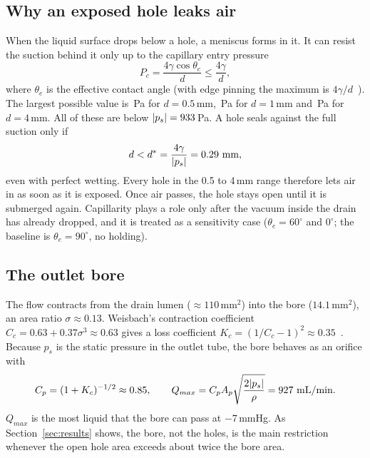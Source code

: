 \documentclass[10pt,a4paper]{article}
\begin{document}
\subsection{Why an exposed hole leaks air}
When the liquid surface drops below a hole, a meniscus forms in it. It can resist the suction behind it only up to the capillary entry pressure
\begin{equation}
P_c=\frac{4\gamma\cos\theta_e}{d}\le\frac{4\gamma}{d},
\label{eq:pc}
\end{equation}
where $\theta_e$ is the effective contact angle (with edge pinning the maximum is $4\gamma/d$~\cite{oliver1977,degennes2004}). The largest possible value is \numPcHalf\,Pa for $d=0.5$\,mm, \numPcOne\,Pa for $d=1$\,mm and \numPcFour\,Pa for $d=4$\,mm. All of these are below $|p_s|=933$\,Pa. A hole seals against the full suction only if
\begin{equation}
d < d^* = \frac{4\gamma}{|p_s|} = 0.29\ \text{mm},
\label{eq:dstar}
\end{equation}
even with perfect wetting. Every hole in the 0.5 to 4\,mm range therefore lets air in as soon as it is exposed. Once air passes, the hole stays open until it is submerged again. Capillarity plays a role only after the vacuum inside the drain has already dropped, and it is treated as a sensitivity case ($\theta_e=60^\circ$ and $0^\circ$; the baseline is $\theta_e=90^\circ$, no holding).

\subsection{The outlet bore}
The flow contracts from the drain lumen ($\approx110$\,mm$^2$) into the bore ($14.1$\,mm$^2$), an area ratio $\sigma\approx0.13$. Weisbach's contraction coefficient $C_c=0.63+0.37\sigma^3\approx0.63$ gives a loss coefficient $K_c=(1/C_c-1)^2\approx0.35$~\cite{idelchik1994}. Because $p_s$ is the static pressure in the outlet tube, the bore behaves as an orifice with
\begin{equation}
C_p = (1+K_c)^{-1/2}\approx0.85, \qquad
Q_{max}=C_pA_p\sqrt{\frac{2|p_s|}{\rho}}=927\ \text{mL/min}.
\label{eq:cp}
\end{equation}
$Q_{max}$ is the most liquid that the bore can pass at $-7$\,mmHg. As Section~\ref{sec:results} shows, the bore, not the holes, is the main restriction whenever the open hole area exceeds about twice the bore area.
\end{document}
